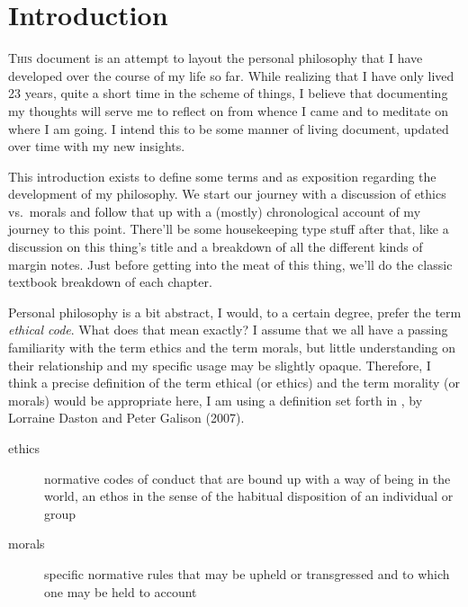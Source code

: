 \documentclass[./butidigress.tex]{subfiles}
\begin{document}
\chapter{Introduction}\label{chap:intro}
\newpage

\setcounter{footnote}{0}

\lettrine{T}{his} document is an attempt to layout the personal philosophy that I have developed over the course of my life so far.
While realizing that I have only lived 23 years, quite a short time in the scheme of things, I believe that documenting my thoughts will serve me to reflect on from whence I came and to meditate on where I am going.
I intend this to be some manner of living document, updated over time with my new insights.

This introduction exists to define some terms and as exposition regarding the development of my philosophy.
We start our journey with a discussion of ethics vs.\ morals and follow that up with a (mostly) chronological account of my journey to this point.
There'll be some housekeeping type stuff after that, like a discussion on this thing's title and a breakdown of all the different kinds of margin notes.
Just before getting into the meat of this thing, we'll do the classic textbook breakdown of each chapter.

\label{sec:ethics}
Personal philosophy is a bit abstract, I would, to a certain degree, prefer the term \emph{ethical code}.
What does that mean exactly?
I assume that we all have a passing familiarity with the term ethics and the term morals, but little understanding on their relationship and my specific usage may be slightly opaque.
Therefore, I think a precise definition of the term ethical (or ethics) and the term morality (or morals) would be appropriate here, I am using a definition set forth in , by Lorraine Daston and Peter Galison (2007).\autocite{objectivity}
\begin{description}
    \item [ethics] normative codes of conduct that are bound up with a way of being in the world, an ethos in the sense of the habitual disposition of an individual or group
    \item [morals] specific normative rules that may be upheld or transgressed and to which one may be held to account
\end{description}
\end{document}
